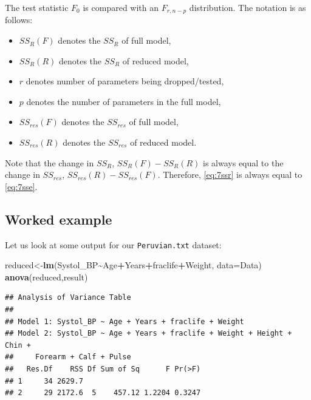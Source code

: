 \documentclass[
]{book}
\newenvironment{Shaded}{\begin{snugshade}}{\end{snugshade}}
\newcommand{\AttributeTok}[1]{\textcolor[rgb]{0.13,0.29,0.53}{#1}}
\newcommand{\FunctionTok}[1]{\textcolor[rgb]{0.13,0.29,0.53}{\textbf{#1}}}
\newcommand{\NormalTok}[1]{#1}
\newcommand{\OtherTok}[1]{\textcolor[rgb]{0.56,0.35,0.01}{#1}}
\newcommand{\SpecialCharTok}[1]{\textcolor[rgb]{0.81,0.36,0.00}{\textbf{#1}}}
\providecommand{\tightlist}{%
  \setlength{\itemsep}{0pt}\setlength{\parskip}{0pt}}
\begin{document}
The test statistic \(F_0\) is compared with an \(F_{r,n-p}\) distribution. The notation is as follows:

\begin{itemize}
\tightlist
\item
  \(SS_R(F)\) denotes the \(SS_R\) of full model,
\item
  \(SS_R(R)\) denotes the \(SS_R\) of reduced model,
\item
  \(r\) denotes number of parameters being dropped/tested,
\item
  \(p\) denotes the number of parameters in the full model,
\item
  \(SS_{res}(F)\) denotes the \(SS_{res}\) of full model,
\item
  \(SS_{res}(R)\) denotes the \(SS_{res}\) of reduced model.
\end{itemize}

Note that the change in \(SS_R\), \(SS_R(F)-SS_R(R)\) is always equal to the change in \(SS_{res}\), \(SS_{res}(R)-SS_{res}(F)\). Therefore, \eqref{eq:7ssr} is always equal to \eqref{eq:7sse}.

\hypertarget{worked-example}{%
\subsection{Worked example}\label{worked-example}}

Let us look at some output for our \texttt{Peruvian.txt} dataset:

\begin{Shaded}
\begin{Highlighting}[]
\NormalTok{reduced}\OtherTok{\textless{}{-}}\FunctionTok{lm}\NormalTok{(Systol\_BP}\SpecialCharTok{\textasciitilde{}}\NormalTok{Age}\SpecialCharTok{+}\NormalTok{Years}\SpecialCharTok{+}\NormalTok{fraclife}\SpecialCharTok{+}\NormalTok{Weight, }\AttributeTok{data=}\NormalTok{Data)}
\FunctionTok{anova}\NormalTok{(reduced,result)}
\end{Highlighting}
\end{Shaded}

\begin{verbatim}
## Analysis of Variance Table
## 
## Model 1: Systol_BP ~ Age + Years + fraclife + Weight
## Model 2: Systol_BP ~ Age + Years + fraclife + Weight + Height + Chin + 
##     Forearm + Calf + Pulse
##   Res.Df    RSS Df Sum of Sq      F Pr(>F)
## 1     34 2629.7                           
## 2     29 2172.6  5    457.12 1.2204 0.3247
\end{verbatim}
\end{document}
